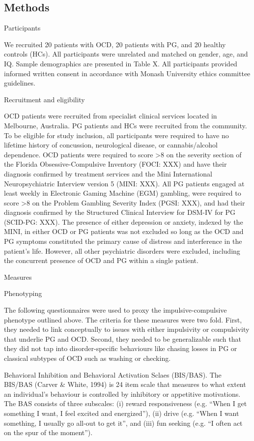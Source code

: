\subsection{Methods}

Participants

We recruited 20 patients with OCD, 20 patients with PG, and 20 healthy controls (HCs). All participants were unrelated and matched on gender, age, and IQ. Sample demographics are presented in Table X. All participants provided informed written consent in accordance with Monash University ethics committee guidelines.

Recruitment and eligibility

OCD patients were recruited from specialist clinical services located in Melbourne, Australia. PG patients and HCs were recruited from the community. To be eligible for study inclusion, all participants were required to have no lifetime history of concussion, neurological disease, or cannabis/alcohol dependence. OCD patients were required to score >8 on the severity section of the Florida Obsessive-Compulsive Inventory (FOCI: XXX) and have their diagnosis confirmed by treatment services and the Mini International Neuropsychiatric Interview version 5 (MINI: XXX). All PG patients engaged at least weekly in Electronic Gaming Machine (EGM) gambling, were required to score >8 on the Problem Gambling Severity Index (PGSI: XXX), and had their diagnosis confirmed by the Structured Clinical Interview for DSM-IV for PG (SCID-PG: XXX). The presence of either depression or anxiety, indexed by the MINI, in either OCD or PG patients was not excluded so long as the OCD and PG symptoms constituted the primary cause of distress and interference in the patient’s life. However, all other psychiatric disorders were excluded, including the concurrent presence of OCD and PG within a single patient.

Measures

Phenotyping
	
	The following questionnaires were used to proxy the impulsive-compulsive phenotype outlined above. The criteria for these measures were two fold. First, they needed to link conceptually to issues with either impulsivity or compulsivity that underlie PG and OCD. Second, they needed to be generalizable such that they did not tap into disorder-specific behaviours like chasing losses in PG or classical subtypes of OCD such as washing or checking.

	Behavioral Inhibition and Behavioral Activation Sclaes (BIS/BAS). The BIS/BAS (Carver & White, 1994) is 24 item scale that measures to what extent an individual’s behaviour is controlled by inhibitory or appetitive motivations. The BAS consists of three subscales: (i) reward responsiveness (e.g. “When I get something I want, I feel excited and energized”), (ii) drive (e.g. “When I want something, I usually go all-out to get it”, and (iii) fun seeking (e.g. “I often act on the spur of the moment”).

